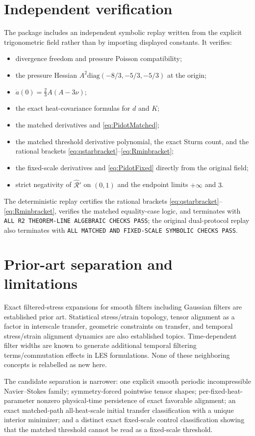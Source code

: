 \documentclass[11pt,a4paper]{article}
\begin{document}
\section{Independent verification}
The package includes an independent symbolic replay written from the explicit trigonometric field rather than by importing displayed constants. It verifies:
\begin{itemize}
\item divergence freedom and pressure Poisson compatibility;
\item the pressure Hessian $A^2\mathrm{diag}(-8/3,-5/3,-5/3)$ at the origin;
\item $\dot a(0)=\tfrac23A(A-3\nu)$;
\item the exact heat-covariance formulas for $d$ and $K$;
\item the matched derivatives and \eqref{eq:PidotMatched};
\item the matched threshold derivative polynomial, the exact Sturm count, and the rational brackets \eqref{eq:qstarbracket}--\eqref{eq:Rminbracket};
\item the fixed-scale derivatives and \eqref{eq:PidotFixed} directly from the original field;
\item strict negativity of $\widehat{\mathcal R}'$ on $(0,1)$ and the endpoint limits $+\infty$ and $3$.
\end{itemize}
The deterministic replay certifies the rational brackets \eqref{eq:qstarbracket}--\eqref{eq:Rminbracket}, verifies the matched equality-case logic, and terminates with \texttt{ALL R2 THEOREM-LINE ALGEBRAIC CHECKS PASS}; the original dual-protocol replay also terminates with \texttt{ALL MATCHED AND FIXED-SCALE SYMBOLIC CHECKS PASS}.

\section{Prior-art separation and limitations}
Exact filtered-stress expansions for smooth filters including Gaussian filters are established prior art. Statistical stress/strain topology, tensor alignment as a factor in interscale transfer, geometric constraints on transfer, and temporal stress/strain alignment dynamics are also established topics. Time-dependent filter widths are known to generate additional temporal filtering terms/commutation effects in LES formulations. None of these neighboring concepts is relabelled as new here.

The candidate separation is narrower: one explicit smooth periodic incompressible Navier--Stokes family; symmetry-forced pointwise tensor shapes; per-fixed-heat-parameter nonzero physical-time persistence of exact favorable alignment; an exact matched-path all-heat-scale initial transfer classification with a unique interior minimizer; and a distinct exact fixed-scale control classification showing that the matched threshold cannot be read as a fixed-scale threshold.
\end{document}
